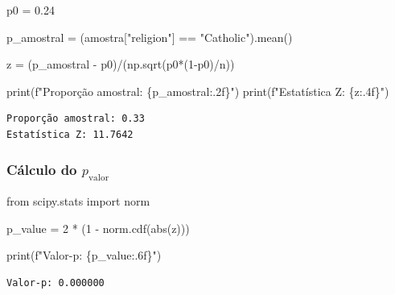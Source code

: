 \documentclass[
  letterpaper,
  DIV=11,
  numbers=noendperiod]{scrreprt}
\newenvironment{Shaded}{\begin{snugshade}}{\end{snugshade}}
\newcommand{\BuiltInTok}[1]{\textcolor[rgb]{0.00,0.23,0.31}{#1}}
\newcommand{\DecValTok}[1]{\textcolor[rgb]{0.68,0.00,0.00}{#1}}
\newcommand{\FloatTok}[1]{\textcolor[rgb]{0.68,0.00,0.00}{#1}}
\newcommand{\ImportTok}[1]{\textcolor[rgb]{0.00,0.46,0.62}{#1}}
\newcommand{\NormalTok}[1]{\textcolor[rgb]{0.00,0.23,0.31}{#1}}
\newcommand{\OperatorTok}[1]{\textcolor[rgb]{0.37,0.37,0.37}{#1}}
\newcommand{\SpecialCharTok}[1]{\textcolor[rgb]{0.37,0.37,0.37}{#1}}
\newcommand{\SpecialStringTok}[1]{\textcolor[rgb]{0.13,0.47,0.30}{#1}}
\newcommand{\StringTok}[1]{\textcolor[rgb]{0.13,0.47,0.30}{#1}}
\begin{document}
\begin{Shaded}
\begin{Highlighting}[]
\NormalTok{p0 }\OperatorTok{=}  \FloatTok{0.24} 

\NormalTok{p\_amostral }\OperatorTok{=}\NormalTok{ (amostra[}\StringTok{"religion"}\NormalTok{] }\OperatorTok{==} \StringTok{"Catholic"}\NormalTok{).mean()}

\NormalTok{z }\OperatorTok{=}\NormalTok{ (p\_amostral }\OperatorTok{{-}}\NormalTok{ p0)}\OperatorTok{/}\NormalTok{(np.sqrt(p0}\OperatorTok{*}\NormalTok{(}\DecValTok{1}\OperatorTok{{-}}\NormalTok{p0)}\OperatorTok{/}\NormalTok{n)) }

\BuiltInTok{print}\NormalTok{(}\SpecialStringTok{f"Proporção amostral: }\SpecialCharTok{\{}\NormalTok{p\_amostral}\SpecialCharTok{:.2f\}}\SpecialStringTok{"}\NormalTok{) }
\BuiltInTok{print}\NormalTok{(}\SpecialStringTok{f"Estatística Z: }\SpecialCharTok{\{}\NormalTok{z}\SpecialCharTok{:.4f\}}\SpecialStringTok{"}\NormalTok{)}
\end{Highlighting}
\end{Shaded}

\begin{verbatim}
Proporção amostral: 0.33
Estatística Z: 11.7642
\end{verbatim}

\subsubsection{\texorpdfstring{Cálculo do
\(p_{\text{valor}}\)}{Cálculo do p\_\{\textbackslash text\{valor\}\}}}\label{cuxe1lculo-do-p_textvalor}

\begin{Shaded}
\begin{Highlighting}[]
\ImportTok{from}\NormalTok{ scipy.stats }\ImportTok{import}\NormalTok{ norm}

\NormalTok{p\_value }\OperatorTok{=} \DecValTok{2} \OperatorTok{*}\NormalTok{ (}\DecValTok{1} \OperatorTok{{-}}\NormalTok{ norm.cdf(}\BuiltInTok{abs}\NormalTok{(z)))}

\BuiltInTok{print}\NormalTok{(}\SpecialStringTok{f"Valor{-}p: }\SpecialCharTok{\{}\NormalTok{p\_value}\SpecialCharTok{:.6f\}}\SpecialStringTok{"}\NormalTok{)}
\end{Highlighting}
\end{Shaded}

\begin{verbatim}
Valor-p: 0.000000
\end{verbatim}
\end{document}
